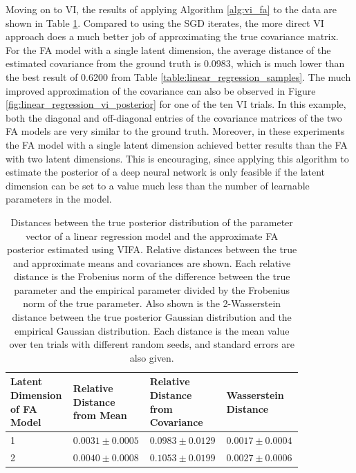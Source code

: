 \documentclass[msc,deptreport.inf]{infthesis} %
\begin{document}
Moving on to VI, the results of applying Algorithm \ref{alg:vi_fa} to the data are shown in Table \ref{table:linear_regression_vi_posterior}. Compared to using the SGD iterates, the more direct VI approach does a much better job of approximating the true covariance matrix. For the FA model with a single latent dimension, the average distance of the estimated covariance from the ground truth is 0.0983, which is much lower than the best result of 0.6200 from Table \ref{table:linear_regression_samples}. The much improved approximation of the covariance can also be observed in Figure \ref{fig:linear_regression_vi_posterior} for one of the ten VI trials. In this example, both the diagonal and off-diagonal entries of the covariance matrices of the two FA models are very similar to the ground truth. Moreover, in these experiments the FA model with a single latent dimension achieved better results than the FA with two latent dimensions. This is encouraging, since applying this algorithm to estimate the posterior of a deep neural network is only feasible if the latent dimension can be set to a value much less than the number of learnable parameters in the model. 

\begin{table}[h!]
	\begin{center}
		\begin{tabular}{|| p{0.21\linewidth} p{0.21\linewidth} p{0.21\linewidth} p{0.21\linewidth} ||} 
 			\hline
 			Latent Dimension of FA Model & Relative Distance from Mean & Relative Distance from Covariance & Wasserstein Distance \\ [0.5ex] 
 			\hline\hline
			1 & $0.0031 \pm 0.0005$ & $0.0983 \pm 0.0129$ & $0.0017 \pm 0.0004$ \\ [1ex] 
			\hline
 			2 & $0.0040 \pm 0.0008$ & $ 0.1053 \pm 0.0199$ & $ 0.0027 \pm 0.0006$ \\ [1ex] 
			\hline
		\end{tabular}
		\caption{Distances between the true posterior distribution of the parameter vector of a linear regression model and the approximate FA posterior estimated using VIFA. Relative distances between the true and approximate means and covariances are shown. Each relative distance is the Frobenius norm of the difference between the true parameter and the empirical parameter divided by the Frobenius norm of the true parameter. Also shown is the 2-Wasserstein distance between the true posterior Gaussian distribution and the empirical Gaussian distribution. Each distance is the mean value over ten trials with different random seeds, and standard errors are also given.}
		\label{table:linear_regression_vi_posterior}
	\end{center}
\end{table}
\end{document}
